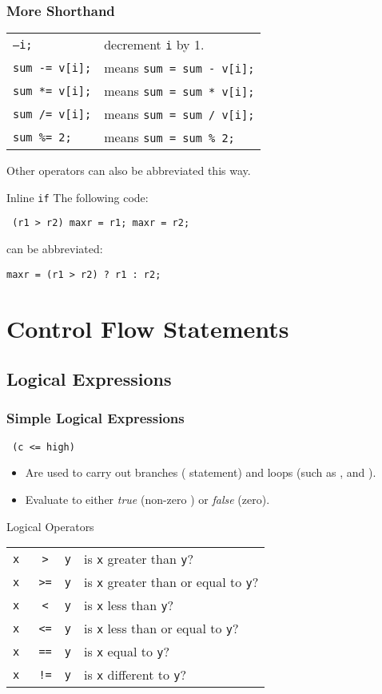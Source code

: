 \documentclass[smaller,table]{beamer} %
\begin{document}
\begin{frame}
\frametitle{More Shorthand}
\begin{tabular}{l l}
\tt --i;&decrement {\tt i} by 1.\\
\tt sum -= v[i];&means {\tt sum = sum - v[i];}\\
\tt sum *= v[i];&means {\tt sum = sum * v[i];}\\
\tt sum /= v[i];&means {\tt sum = sum / v[i];}\\
\tt sum \%= 2;&means {\tt sum = sum \% 2;}
\end{tabular}
Other operators can also be abbreviated this way.
\begin{exampleblock}{Inline {\tt if}}
The following code:
\begin{center}
\tt {} (r1 > r2) maxr = r1;  maxr = r2;
\end{center}
can be abbreviated:
\begin{center}
\tt maxr = (r1 > r2) ? r1 : r2;
\end{center}
\end{exampleblock}
\end{frame}



\section{Control Flow Statements}
\subsection{Logical Expressions}
\begin{frame}
\frametitle{Simple Logical Expressions}
\texttt{\kl   {} (c <= high)}\\ 
\begin{itemize}
\item Are used to carry out branches ({\tt {}} statement) and loops (such as {\tt {}}, and {\tt {}}).
\item Evaluate to either \emph{true} (non-zero ) or \emph{false} (zero).
\end{itemize}

\begin{block}{Logical Operators}
\begin{center}
\begin{tabular}{l c l l}
\tt x &\tt>&\tt  y& is {\tt x} greater than {\tt y}?\\
\tt x &\tt>=&\tt y& is {\tt x} greater than or equal to {\tt y}?\\
\tt x &\tt<&\tt  y& is {\tt x} less than {\tt y}?\\
\tt x &\tt<=&\tt y& is {\tt x} less than or equal to {\tt y}?\\
\alert{\tt x }&\tt\alert{==}&\alert{\tt y}&\alert{is {\tt x} equal to {\tt y}?}\\
\tt x &\tt!=&\tt y& is {\tt x} different to {\tt y}?
\end{tabular}
\end{center}
\end{block}
\end{frame}
\end{document}

